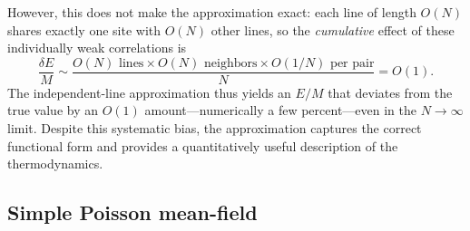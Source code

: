 \documentclass[aps, pre, reprint, amsmath, amssymb, superscriptaddress, floatfix]{revtex4-2}
\begin{document}
However, this does not make the approximation exact: each line of
length $O(N)$ shares exactly one site with $O(N)$ other lines, so the
\emph{cumulative} effect of these individually weak correlations is
\begin{equation}
  \frac{\delta E}{M}
  \sim \frac{O(N)\text{ lines} \times O(N)\text{ neighbors} \times O(1/N)\text{ per pair}}{N}
  = O(1).
  \label{eq:mf_error}
\end{equation}
The independent-line approximation thus yields an $E/M$ that deviates
from the true value by an $O(1)$ amount---numerically a few
percent---even in the $N \to \infty$ limit.  Despite this systematic
bias, the approximation captures the correct functional form and
provides a quantitatively useful description of the thermodynamics.

\subsection{Simple Poisson mean-field}
\end{document}
